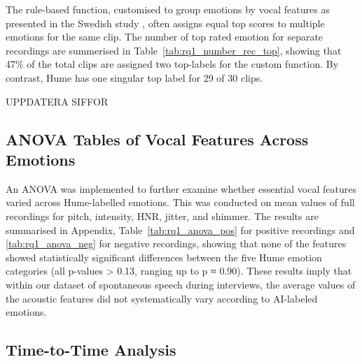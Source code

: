 The rule-based function, customised to group emotions by vocal features as presented in the Swedish study \autocite{Ekberg2023}, often assigns equal top scores to multiple emotions for the same clip. 
The number of top rated emotion for separate recordings are summerised in Table~\ref{tab:rq1_number_rec_top}, showing that 47\% of the total clips are assigned two top-labels for the custom function. By contrast, Hume has one singular top label for 29 of 30 clips. 

\medskip

UPPDATERA SIFFOR

\medskip
    

\subsection{ANOVA Tables of Vocal Features Across Emotions}
An ANOVA was implemented to further examine whether essential vocal features varied across Hume-labelled emotions. This was conducted on mean values of full recordings for pitch, intensity, HNR, jitter, and shimmer. 
The results are summarised in Appendix, Table~\ref{tab:rq1_anova_pos} for positive recordings and \ref{tab:rq1_anova_neg} for negative recordings, 
showing that none of the features showed statistically significant differences between the five Hume emotion categories (all p-values > 0.13, ranging up to p ≈ 0.90). 
These results imply that within our dataset of spontaneous speech during interviews, the average values of the acoustic features did not systematically vary according to AI-labeled emotions. 

\subsection{Time-to-Time Analysis}



